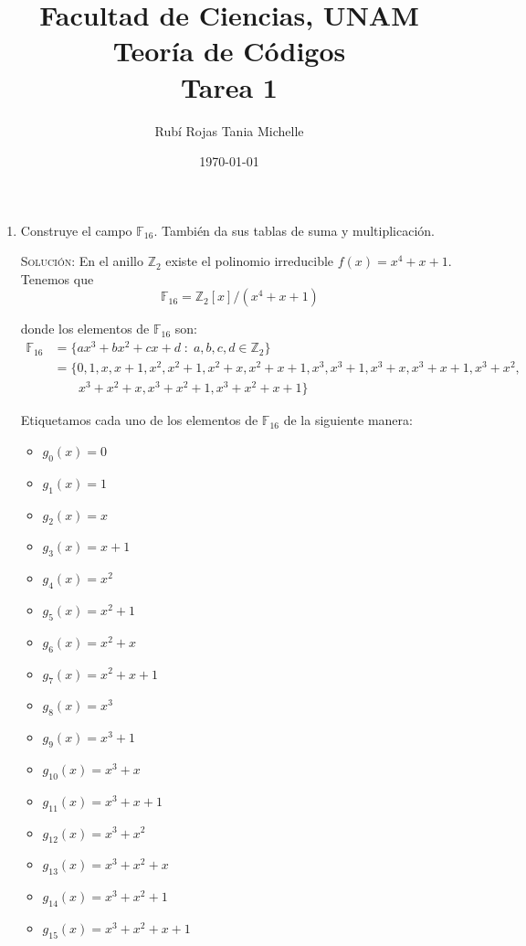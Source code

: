 \documentclass[letterpaper,11pt]{article}
\title{Facultad de Ciencias, UNAM \\ Teoría de Códigos \\ Tarea 1}
\author{Rubí Rojas Tania Michelle}
\date{\today}
\begin{document}
\maketitle

\begin{enumerate}
    \item Construye el campo $\mathbb{F}_{16}$. También da sus tablas de suma y 
    multiplicación.
    
    \textsc{Solución:} En el anillo $\mathbb{Z}_{2}$ existe el polinomio 
    irreducible $f(x) = x^{4}+x+1$. Tenemos que 
    \begin{equation}
        \mathbb{F}_{16} = \mathbb{Z}_{2}[x]/(x^{4}+x+1)
    \end{equation}
    
    donde los elementos de $\mathbb{F}_{16}$ son:
    \begin{align*}
        \mathbb{F}_{16} 
        &= \{ax^{3} + bx^{2} + cx + d \; : \; a,b,c,d \in \mathbb{Z}_{2}\} \\
        &= \{0, 1, x, x + 1, x^2, x^2 + 1, x^2 + x, x^2 + x + 1, x^3, 
             x^3 + 1, x^3 + x, x^3 + x + 1, x^3 + x^2, \\ 
        &\; \; \; \; \; \; \; x^3 + x^2 + x, x^3 + x^2 + 1, x^3 + x^2 + x + 1\}
    \end{align*}
    
    Etiquetamos cada uno de los elementos de $\mathbb{F}_{16}$ de la siguiente 
    manera:
    \begin{multicols}{3}
        \begin{itemize}
            \item $g_{0}(x) = 0$
            \item $g_{1}(x) = 1$
            \item $g_{2}(x) = x$
            \item $g_{3}(x) = x+1$
            \item $g_{4}(x) = x^{2}$
            \item $g_{5}(x) = x^{2}+1$
            \item $g_{6}(x) = x^{2}+x$
            \item $g_{7}(x) = x^{2}+x+1$
            \item $g_{8}(x) = x^{3}$
            \item $g_{9}(x) = x^{3}+1$
            \item $g_{10}(x) = x^{3}+x$
            \item $g_{11}(x) = x^{3}+x+1$
            \item $g_{12}(x) = x^{3}+x^{2}$
            \item $g_{13}(x) = x^{3}+x^{2}+x$
            \item $g_{14}(x) = x^{3}+x^{2}+1$
            \item $g_{15}(x) = x^{3}+x^{2}+x+1$
        \end{itemize}
    \end{multicols}


\end{enumerate}
\end{document}

